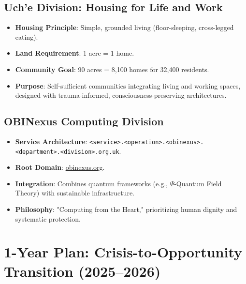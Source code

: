 \documentclass[12pt]{article}\usepackage[a4paper,margin=1in]{geometry}
\begin{document}
\subsection*{Uch'e Division: Housing for Life and Work}
\begin{itemize}
    \item \textbf{Housing Principle}: Simple, grounded living (floor-sleeping, cross-legged eating).
    \item \textbf{Land Requirement}: 1 acre = 1 home.
    \item \textbf{Community Goal}: 90 acres = 8,100 homes for 32,400 residents.
    \item \textbf{Purpose}: Self-sufficient communities integrating living and working spaces, designed with trauma-informed, consciousness-preserving architectures.
\end{itemize}\subsection*{OBINexus Computing Division}
\begin{itemize}
    \item \textbf{Service Architecture}: \texttt{<service>.<operation>.<obinexus>.<department>.<division>.org.uk}.
    \item \textbf{Root Domain}: \href{http://obinexus.org}{obinexus.org}.
    \item \textbf{Integration}: Combines quantum frameworks (e.g., $\Psi$-Quantum Field Theory) with sustainable infrastructure.
    \item \textbf{Philosophy}: "Computing from the Heart," prioritizing human dignity and systematic protection.
\end{itemize}\section*{1-Year Plan: Crisis-to-Opportunity Transition (2025--2026)}
\end{document}
